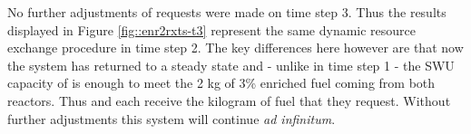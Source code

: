 No further adjustments of requests were made on time step 3. Thus the results 
displayed in Figure \ref{fig::enr2rxts-t3} represent the same dynamic resource 
exchange procedure in time step 2.  The key differences here however are that 
now the system has returned to a steady state and - unlike in time step 1 - 
the SWU capacity of \Enrichment{} is enough to meet the 2 kg of 3\% enriched
fuel coming from both reactors.  Thus  and  each receive 
the kilogram of fuel that they request.  Without further adjustments this 
system will continue \emph{ad infinitum}.

